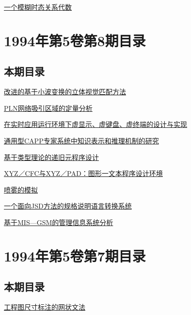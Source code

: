 \documentclass[a4paper]{article}
\begin{document}
\href{http://www.jos.org.cn/ch/reader/download_pdf.aspx?file_no=19940910&year_id=1994&quarter_id=9&falg=1}{一个模糊时态关系代数}


\section{\textbf{1994年第5卷第8期目录}}
\subsection{本期目录}
\href{http://www.jos.org.cn/ch/reader/download_pdf.aspx?file_no=19940801&year_id=1994&quarter_id=8&falg=1}{改进的基于小波变换的立体视觉匹配方法}

\href{http://www.jos.org.cn/ch/reader/download_pdf.aspx?file_no=19940802&year_id=1994&quarter_id=8&falg=1}{PLN网络吸引区域的定量分析}

\href{http://www.jos.org.cn/ch/reader/download_pdf.aspx?file_no=19940803&year_id=1994&quarter_id=8&falg=1}{在实时应用运行环境下虚显示、虚键盘、虚终端的设计与实现}

\href{http://www.jos.org.cn/ch/reader/download_pdf.aspx?file_no=19940804&year_id=1994&quarter_id=8&falg=1}{通用型CAPP专家系统中知识表示和推理机制的研究}

\href{http://www.jos.org.cn/ch/reader/download_pdf.aspx?file_no=19940805&year_id=1994&quarter_id=8&falg=1}{基于类型理论的递旧元程序设计}

\href{http://www.jos.org.cn/ch/reader/download_pdf.aspx?file_no=19940806&year_id=1994&quarter_id=8&falg=1}{XYZ／CFC与XYZ／PAD：图形一文本程序设计环境}

\href{http://www.jos.org.cn/ch/reader/download_pdf.aspx?file_no=19940807&year_id=1994&quarter_id=8&falg=1}{喷雾的模拟}

\href{http://www.jos.org.cn/ch/reader/download_pdf.aspx?file_no=19940808&year_id=1994&quarter_id=8&falg=1}{一个面向JSD方法的规格说明语言转换系统}

\href{http://www.jos.org.cn/ch/reader/download_pdf.aspx?file_no=19940809&year_id=1994&quarter_id=8&falg=1}{基于MIS—GSM的管理信息系统分析}


\section{\textbf{1994年第5卷第7期目录}}
\subsection{本期目录}
\href{http://www.jos.org.cn/ch/reader/download_pdf.aspx?file_no=19940701&year_id=1994&quarter_id=7&falg=1}{工程图尺寸标注的网状文法}
\end{document}
